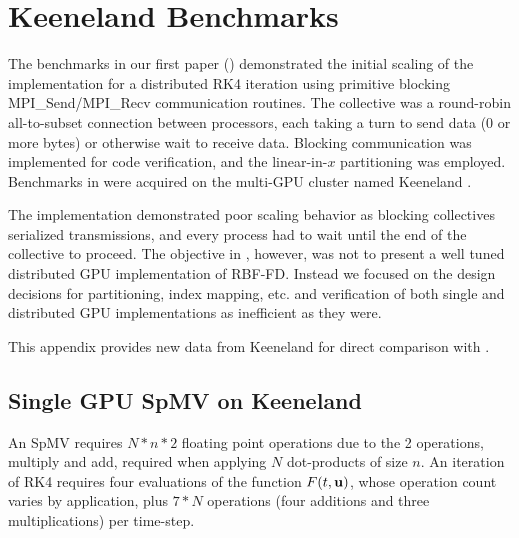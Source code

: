 
\chapter{Keeneland Benchmarks}
\label{app:keeneland_alltoallv_benchmarks}

The benchmarks in our first paper (\cite{BolligFlyerErlebacher2012}) demonstrated the initial scaling of the implementation for a distributed RK4 iteration using primitive blocking MPI\_Send/MPI\_Recv communication routines. The collective was a round-robin all-to-subset connection between processors, each taking a turn to send data (0 or more bytes) or otherwise wait to receive data. Blocking communication was implemented for code verification, and the linear-in-$x$ partitioning was employed. Benchmarks in \cite{BolligFlyerErlebacher2012} were acquired on the multi-GPU cluster named Keeneland \cite{Vetter2011}. 

The implementation demonstrated poor scaling behavior as blocking collectives serialized transmissions, and every process had to wait until the end of the collective to proceed. The objective in \cite{BolligFlyerErlebacher2012}, however, was not to present a well tuned distributed GPU implementation of RBF-FD. Instead we focused on the design decisions for partitioning, index mapping, etc. and verification of both single and distributed GPU implementations as inefficient as they were. 


This appendix provides new data from Keeneland for direct comparison with \cite{BolligFlyerErlebacher2012}.


\section{Single GPU SpMV on Keeneland} 


An SpMV requires $N * n * 2$ floating point operations due to the 2 operations, multiply and add, required when applying $N$ dot-products of size $n$. An iteration of RK4 requires four evaluations of the function $F(t,\mathbf{u})$, whose operation count varies by application, plus $7*N$ operations (four additions and three multiplications) per time-step. 

